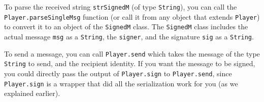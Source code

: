 To parse the received string  {\tt strSignedM} (of type {\tt String}),
you can call
the {\tt Player.parseSingleMsg} function
(or call it from any object that extends {\tt Player})
to convert it to an object of the {\tt SignedM} class.
The {\tt SignedM} class
includes the actual message {\tt msg}  as a {\tt String},
the {\tt signer}, and the signature
    {\tt sig} as a {\tt String}.

To send a message, you can call
    {\tt Player.send}
which takes the message of the type {\tt String} to send,
and the recipient identity.
If you want the message
to be signed, you could directly pass
the output of {\tt Player.sign}
to {\tt Player.send}, since
    {\tt Player.sign}
is a wrapper that did all
the serialization work for you (as we explained earlier).





